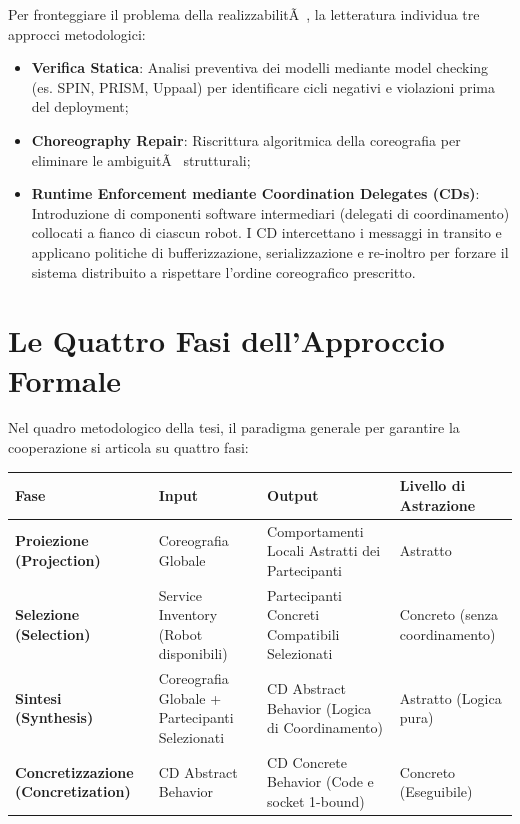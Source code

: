 ﻿\documentclass[11pt, a4paper]{report}
\begin{document}
Per fronteggiare il problema della realizzabilitÃ , la letteratura individua tre approcci metodologici:
\begin{itemize}
    \item \textbf{Verifica Statica}: Analisi preventiva dei modelli mediante model checking (es. SPIN, PRISM, Uppaal) per identificare cicli negativi e violazioni prima del deployment;
    \item \textbf{Choreography Repair}: Riscrittura algoritmica della coreografia per eliminare le ambiguitÃ  strutturali;
    \item \textbf{Runtime Enforcement mediante Coordination Delegates (CDs)}: Introduzione di componenti software intermediari (delegati di coordinamento) collocati a fianco di ciascun robot. I CD intercettano i messaggi in transito e applicano politiche di bufferizzazione, serializzazione e re-inoltro per forzare il sistema distribuito a rispettare l'ordine coreografico prescritto.
\end{itemize}

\section{Le Quattro Fasi dell'Approccio Formale}

Nel quadro metodologico della tesi, il paradigma generale per garantire la cooperazione si articola su quattro fasi:

\begin{table}[h!]
\centering
\small
\renewcommand{\arraystretch}{1.3}
\begin{tabularx}{\textwidth}{>{\bfseries}l X X X}
\toprule
\rowcolor{lightBg}
Fase & Input & Output & Livello di Astrazione \\
\midrule
Proiezione (Projection) & Coreografia Globale & Comportamenti Locali Astratti dei Partecipanti & Astratto \\
\hline
Selezione (Selection) & Service Inventory (Robot disponibili) & Partecipanti Concreti Compatibili Selezionati & Concreto (senza coordinamento) \\
\hline
Sintesi (Synthesis) & Coreografia Globale + Partecipanti Selezionati & CD Abstract Behavior (Logica di Coordinamento) & Astratto (Logica pura) \\
\hline
Concretizzazione (Concretization) & CD Abstract Behavior & CD Concrete Behavior (Code e socket 1-bound) & Concreto (Eseguibile) \\
\bottomrule
\end{tabularx}
\end{table}
\end{document}

